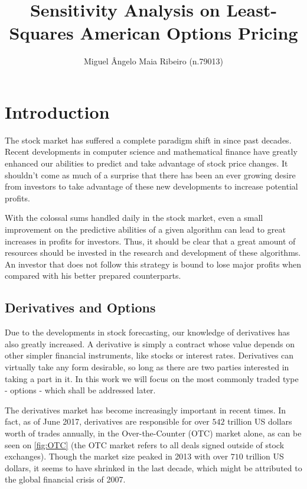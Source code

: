 \documentclass[a4paper,prd,twocolumn,nofootinbib,superscriptaddress,floatfix]{revtex4}
\begin{document}
\title{Sensitivity Analysis on Least-Squares American Options Pricing}

\author{Miguel Ângelo Maia Ribeiro (n.79013)}




\maketitle
\section{Introduction}
The stock market has suffered a complete paradigm shift in since past decades. Recent developments in computer science and mathematical finance have greatly enhanced our abilities to predict and take advantage of stock price changes. It shouldn't come as much of a surprise that there has been an ever growing desire from investors to take advantage of these new developments to increase potential profits.

With the colossal sums handled daily in the stock market, even a small improvement on the predictive abilities of a given algorithm can lead to great increases in profits for investors. Thus, it should be clear that a great amount of resources should be invested in the research and development of these algorithms. An investor that does not follow this strategy is bound to lose major profits when compared with his better prepared counterparts.




\subsection{Derivatives and Options}
Due to the developments in stock forecasting, our knowledge of derivatives has also greatly increased. A derivative is simply a contract whose value depends on other simpler financial instruments, like stocks or interest rates. Derivatives can virtually take any form desirable, so long as there are two parties interested in taking a part in it. In this work we will focus on the most commonly traded type - options - which shall be addressed later.

The derivatives market has become increasingly important in recent times. In fact, as of June 2017, derivatives are responsible for over $542$ trillion US dollars worth of trades annually, in the Over-the-Counter (OTC) market alone, as can be seen on \autoref{fig:OTC} (the OTC market refers to all deals signed outside of stock exchanges). Though the market size peaked in 2013 with over $710$ trillion US dollars, it seems to have shrinked in the last decade, which might be attributed to the global financial crisis of 2007.
\end{document}
